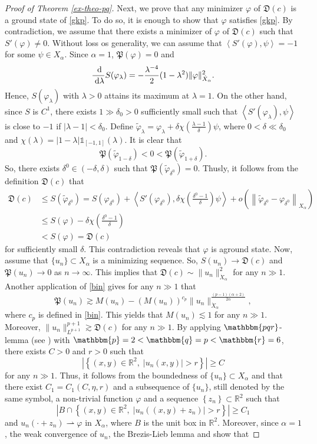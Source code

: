 \documentclass[10pt]{article}
\newcommand{\scal}[1]{\left\langle #1 \right\rangle}
\newcommand{\sett}[1]{\left\{   #1   \right\}}
\newcommand{\norm}[1]{\left\|   #1   \right\|}
\newcommand{\abso}[1]{\left|   #1   \right|}
\newcommand{\paar}[1]{\left( #1 \right)}
\newcommand{\fd}{\mathfrak{D}}
\newcommand{\fp}{\mathfrak{P}}
\numberwithin{equation}{section}
\newcommand{\dd}{\;{\rm d}}
\newcommand{\ff}{\varphi}
\newcommand{\lam}{\lambda}
\newcommand{\al}{\alpha}
\newcommand{\rt}{{\mathbb{R}^2}}
\begin{document}
\begin{proof}[Proof of Theorem \ref{ex-theo-pq}]
		Next, we prove that any minimizer $\ff$ of $\fd(c)$ is a ground state of \eqref{gkp}. To do so, it is enough to show that $\ff$ satisfies \eqref{gkp}.  By contradiction, we assume that there exists a minimizer of $\ff$ of $\fd(c)$ such that $S'(\ff)\neq0$. Without loss os generality, we can assume that $\scal{S'(\ff),\psi}=-1$ for some $\psi\in X_\al$. Since $\al=1$, $\fp(\ff)=0$ and $$\frac{\dd}{\dd\lam}S(\ff_\lam)=-\frac{\lam^{-4}}2(1-\lam^2)\|\ff\|_{\dot{X}_\al}^2.$$
		Hence, $S(\ff_\lam)$ with $\lam>0$ attains its maximum at $\lam=1$. 
		On the other hand, since $S$ is $C^1$, there exists $1\gg\delta_0>0$ sufficiently small such that $\scal{S'(\ff_\lam),\psi}$ is close to $-1$ if $|\lam-1|<\delta_0$. Define $\tilde\ff_\lam=\ff_\lam+\delta\chi\paar{\frac{\lam-1}{\delta}}\psi$, where $0<\delta\ll\delta_0$ and $\chi(\lam)=|1-\lam|\mathbb{1}_{[-1,1]}(\lam)$. It is clear that
		\[
		\fp(\tilde\ff_{1-\delta})<0<\fp(\tilde\ff_{1+\delta}).
		\]
		So, there exists $\delta^0\in(-\delta,\delta)$ such that $\fp(\tilde\ff_{\delta^0})=0$. Thusly, it follows from the definition $\fd(c)$  that
		\[
		\begin{split}
			\fd(c)&\leq S(\tilde\ff_{\delta^0})
			=
			S( \ff_{\delta^0})+
			\scal{S'(\ff_{\delta^0}),\delta\chi\paar{\frac{\delta^0-1}{\delta}}\psi}
			+o\paar{\norm{\tilde\ff_{\delta^0}-\ff_{\delta^0}}_{X_\al}}\\
			&\leq S( \ff )-\delta\chi\paar{\frac{\delta^0-1}{\delta}}\\
			&<S(\ff)=\fd(c)
		\end{split}
		\]
		for sufficiently small $\delta$. This contradiction reveals that $\ff$ is aground state.
		Now, assume that $\{u_n\}\subset X_\al$ is a minimizing sequence. So, $S(u_n)\to \fd(c)$ and $\fp(u_n)\to0$ as $n\to\infty$. This implies that $\fd(c)\sim\|u_n\|_{\dot{X}_\al}^2$ for any $n\gg1$. Another application of \eqref{bin} gives for any $n\gg1$ that
		\[
		\fp(u_n)\gtrsim M(u_n)-\paar{M(u_n)}^{c_p} \|u_n\|_{\dot{X}_\al}^{\frac{(p-1)(\al+2)}{2\al}},
		\]
		where $c_p$ is defined in \eqref{bin}.
		This yields that $M(u_n)\lesssim1$ for any $n\gg1$. Moreover, $\|u_n\|_{L^{p+1}}^{p+1}\gtrsim \fd(c)$ for any $n\gg1$. By applying $\mathbbm{pqr}$-lemma (see \cite{fll}) with $\mathbbm{p}=2<\mathbbm{q}=p<\mathbbm{r}=6$, there exists $C>0$
		and $r>0$ such that
		\[
		\abso{\sett{(x,y)\in\rt,\; |u_n(x,y)|>r}}\geq C
		\]
		for any $n\gg1$.
		Thus, it follows from the boundedness of $\{u_n\}\subset X_\al$ and \cite[Lemma 4]{liuwang} that there exist $C_1=C_1(C,\eta,r)$ and  a subsequence of $\{u_n\}$, still denoted by the same symbol, a non-trivial function $\ff$ and a sequence $\sett{z_n}\subset\rt$ such that 
		\[
		\abso{B\cap\sett{(x,y)\in\rt,\; |u_n((x,y)+z_n)|>r}}\geq C_1
		\]
		and
		$
		u_n(\cdot+z_n)\rightharpoonup\ff
		$ in $X_\al$, where $B$ is the unit box in $\rt$. Moreover, since $\al=1$, the weak convergence of $u_n$, the Brezis-Lieb lemma and \cite{liuwang} show  that
		

\end{proof}
\end{document}
